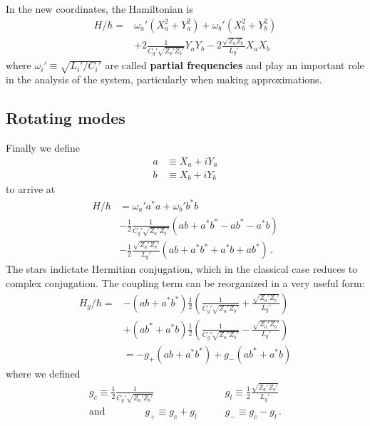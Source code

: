 \documentclass{article}
\begin{document}
In the new coordinates, the Hamiltonian is
\begin{align}
  H / \hbar
  =& \omega_a' \left(X_a^2 + Y_a^2 \right)
  +  \omega_b' \left(X_b^2 + Y_b^2 \right) \nonumber \\
  &+ 2 \frac{1}{C_g' \sqrt{Z_a' Z_b'}} Y_a Y_b
   - 2 \frac{\sqrt{Z_a Z_b}}{L_g'} X_a X_b
\end{align}
where $\omega_i' \equiv \sqrt{L_i' / C_i'}$ are called \textbf{partial frequencies} and play an important role in the analysis of the system, particularly when making approximations.

\subsection{Rotating modes}

Finally we define
\begin{align}
  a &\equiv X_a + i Y_a \nonumber \\
  b &\equiv X_b + i Y_b
\end{align}
to arrive at
\begin{align}
  H / \hbar
  &= \omega_a' a^* a + \omega_b' b^* b \nonumber \\
  & - \frac{1}{2} \frac{1}{C_g' \sqrt{Z_a' Z_b'}} (ab + a^* b^* - a b^* - a^* b) \nonumber \\
  &- \frac{1}{2} \frac{\sqrt{Z_a' Z_b'}}{L_g'} (ab + a^* b^* + a^* b + a b^*)
  \, .
\end{align}
The stars indictate Hermitian conjugation, which in the classical case reduces to complex conjugation.
The coupling term can be reorganized in a very useful form:
\begin{align}
  H_g / \hbar =
  &- \left( a b + a^* b^* \right)
    \frac{1}{2} \left(
      \frac{1}{C_g' \sqrt{Z_a' Z_b'}} + \frac{\sqrt{Z_a' Z_b'}}{L_g'}
    \right) \nonumber \\
  &+ \left( a b^* + a^* b \right)
    \frac{1}{2} \left(
      \frac{1}{C_g' \sqrt{Z_a' Z_b'}} - \frac{\sqrt{Z_a' Z_b'}}{L_g'}
    \right) \nonumber \\
  &= -g_+ (ab + a^* b^*) + g_- (ab^* + a^* b)
\end{align}
where we defined
\begin{align}
  g_c \equiv \frac{1}{2} \frac{1}{C_g' \sqrt{Z_a' Z_b'}} &\qquad
  g_l \equiv \frac{1}{2} \frac{\sqrt{Z_a' Z_b'}}{L_g'} \nonumber \\
  \text{and} \qquad \qquad
  g_+ \equiv g_c + g_l &\qquad g_- \equiv g_c - g_l
  \, .
\end{align}
\end{document}
